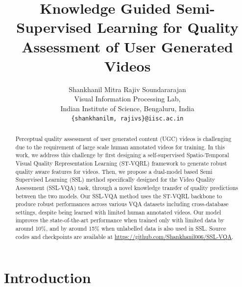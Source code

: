 \documentclass[10pt,twocolumn,letterpaper]{article}
\begin{document}
\title{Knowledge Guided Semi-Supervised Learning for Quality Assessment of User Generated Videos}

\author{Shankhanil Mitra \quad  Rajiv Soundararajan\\
Visual Information Processing Lab, \\
Indian Institute of Science, Bengaluru, India\\
{\tt\small  \{shankhanilm, rajivs\}@iisc.ac.in}}



\maketitle
\ificcvfinal\thispagestyle{empty}\fi

\begin{abstract}
    Perceptual quality assessment of user generated content (UGC) videos is challenging due to the requirement of large scale human annotated videos for training. In this work, we address this challenge by first designing a self-supervised Spatio-Temporal Visual Quality Representation Learning (ST-VQRL) framework to generate robust quality aware features for videos. Then, we propose a dual-model based Semi Supervised Learning (SSL) method specifically designed for the Video Quality Assessment (SSL-VQA) task, through a novel knowledge transfer of quality predictions between the two models. Our SSL-VQA method uses the ST-VQRL backbone to produce robust performances across various VQA datasets including cross-database settings, despite being  learned with limited human annotated videos. Our model improves the state-of-the-art performance when trained only with limited data by around 10\%, and by  around 15\% when unlabelled data is also used in SSL. Source codes and checkpoints are available at 
    \url{https://github.com/Shankhanil006/SSL-VQA}.
\end{abstract}


\section{Introduction}
\end{document}
